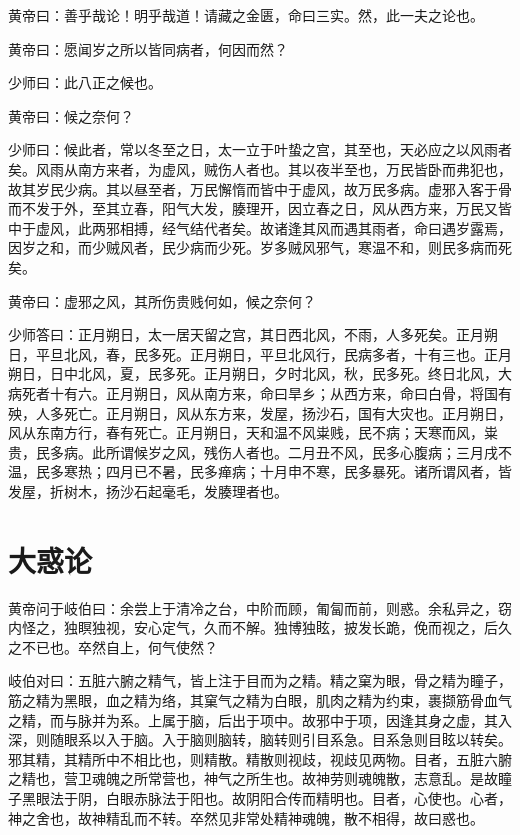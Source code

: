 \documentclass[a4paper,12pt,UTF8,twoside]{ctexbook}
\begin{document}
	黄帝曰：善乎哉论！明乎哉道！请藏之金匮，命曰三实。然，此一夫之论也。
	
	黄帝曰：愿闻岁之所以皆同病者，何因而然？
	
	少师曰：此八正之候也。
	
	黄帝曰：候之奈何？
	
	少师曰：候此者，常以冬至之日，太一立于叶蛰之宫，其至也，天必应之以风雨者矣。风雨从南方来者，为虚风，贼伤人者也。其以夜半至也，万民皆卧而弗犯也，故其岁民少病。其以昼至者，万民懈惰而皆中于虚风，故万民多病。虚邪入客于骨而不发于外，至其立春，阳气大发，腠理开，因立春之日，风从西方来，万民又皆中于虚风，此两邪相搏，经气结代者矣。故诸逢其风而遇其雨者，命曰遇岁露焉，因岁之和，而少贼风者，民少病而少死。岁多贼风邪气，寒温不和，则民多病而死矣。
	
	黄帝曰：虚邪之风，其所伤贵贱何如，候之奈何？
	
	少师答曰：正月朔日，太一居天留之宫，其日西北风，不雨，人多死矣。正月朔日，平旦北风，春，民多死。正月朔日，平旦北风行，民病多者，十有三也。正月朔日，日中北风，夏，民多死。正月朔日，夕时北风，秋，民多死。终日北风，大病死者十有六。正月朔日，风从南方来，命曰旱乡；从西方来，命曰白骨，将国有殃，人多死亡。正月朔日，风从东方来，发屋，扬沙石，国有大灾也。正月朔日，风从东南方行，春有死亡。正月朔日，天和温不风粜贱，民不病；天寒而风，粜贵，民多病。此所谓候岁之风，残伤人者也。二月丑不风，民多心腹病；三月戌不温，民多寒热；四月已不暑，民多瘅病；十月申不寒，民多暴死。诸所谓风者，皆发屋，折树木，扬沙石起毫毛，发腠理者也。
	
	\chapter{大惑论}
		
	黄帝问于岐伯曰：余尝上于清冷之台，中阶而顾，匍匐而前，则惑。余私异之，窃内怪之，独瞑独视，安心定气，久而不解。独博独眩，披发长跪，俛而视之，后久之不已也。卒然自上，何气使然？
	
	岐伯对曰：五脏六腑之精气，皆上注于目而为之精。精之窠为眼，骨之精为瞳子，筋之精为黑眼，血之精为络，其窠气之精为白眼，肌肉之精为约束，裹撷筋骨血气之精，而与脉并为系。上属于脑，后出于项中。故邪中于项，因逢其身之虚，其入深，则随眼系以入于脑。入于脑则脑转，脑转则引目系急。目系急则目眩以转矣。邪其精，其精所中不相比也，则精散。精散则视歧，视歧见两物。目者，五脏六腑之精也，营卫魂魄之所常营也，神气之所生也。故神劳则魂魄散，志意乱。是故瞳子黑眼法于阴，白眼赤脉法于阳也。故阴阳合传而精明也。目者，心使也。心者，神之舍也，故神精乱而不转。卒然见非常处精神魂魄，散不相得，故曰惑也。
	
\end{document}
